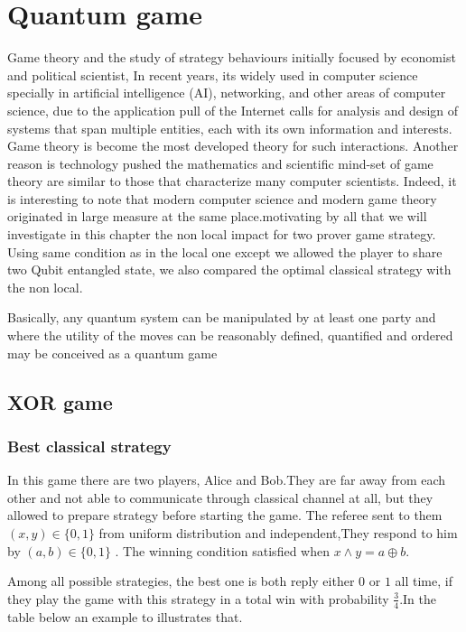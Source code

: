 \chapter{Quantum game}\hfill \break
Game theory  and  the study of strategy behaviours initially focused by economist and political scientist, In recent years, its widely used in computer science specially in artificial intelligence (AI), networking, and other areas of computer science, due to  the application pull of the Internet calls for analysis and design of systems that span multiple entities, each with its own information and interests. Game theory is become the most developed theory for such interactions. Another reason is technology pushed the mathematics and scientific mind-set of game theory are similar to those that characterize many computer scientists. Indeed, it is interesting to note that modern computer science and modern game theory originated in large measure at the same place.motivating by all that we will investigate in this chapter  the non local impact  for two prover game strategy.
Using same condition as in the local one except we allowed the player  to share two Qubit entangled  state, we also compared  the optimal classical strategy with the non local.

Basically, any quantum system can be manipulated by at least one party and where the utility of the moves can be reasonably defined, quantified and ordered may be conceived as a quantum game

\section{XOR game}
\subsection{Best classical strategy}\hfill \break
In this game there are  two players, Alice and Bob.They are far away from each other and not able to communicate through classical channel at all, but they allowed to prepare strategy  before starting the game. The referee sent to them    $(x,y)\in \{0,1\}$  from uniform distribution and independent\citep{PhysRevA.93.022333},They respond  to him by $(a,b)\in \{0,1\}$ .  The   winning  condition  satisfied when $x\wedge y= a\oplus b$.

Among all possible strategies, the best one is both reply either $0$ or $1$ all time, if they play the game with this strategy in a total win with probability $\frac{3}{4}$.In the table below an example to illustrates that.

